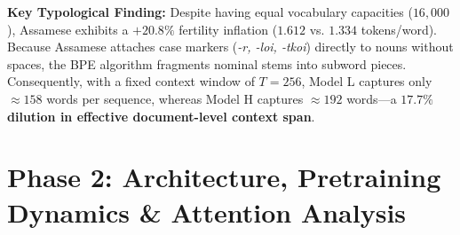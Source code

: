 \documentclass[11pt,a4paper]{article}
\begin{document}
\noindent\textbf{Key Typological Finding:}
Despite having equal vocabulary capacities ($16,000$), Assamese exhibits a $+20.8\%$ fertility inflation ($1.612$ vs. $1.334$ tokens/word). Because Assamese attaches case markers (\textit{-r, -loi, -tkoi}) directly to nouns without spaces, the BPE algorithm fragments nominal stems into subword pieces. Consequently, with a fixed context window of $T=256$, Model L captures only $\approx 158$ words per sequence, whereas Model H captures $\approx 192$ words---a \textbf{$17.7\%$ dilution in effective document-level context span}.

\section{Phase 2: Architecture, Pretraining Dynamics \& Attention Analysis}
\end{document}
